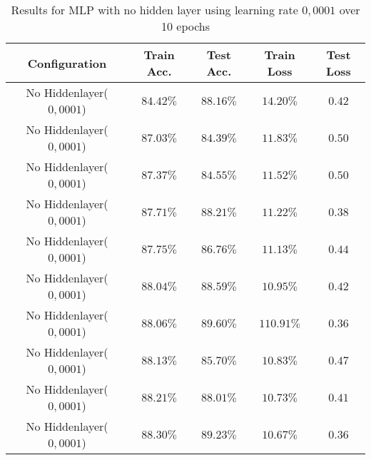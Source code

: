 \documentclass[a4paper]{article}
\begin{document}
\begin{table}[h!]
\centering
\begin{tabular}{|c|c|c|c|c|}
\hline
\textbf{Configuration} & \textbf{Train Acc.} & \textbf{Test Acc.} & \textbf{Train Loss} & \textbf{Test Loss} \\
\hline
No Hiddenlayer($0,0001$) & $84.42\%$ & $88.16\%$ & $14.20\%$ &  $0.42$\\
No Hiddenlayer($0,0001$) & $87.03\%$ & $84.39\%$ & $11.83\%$ &  $0.50$\\
No Hiddenlayer($0,0001$) & $87.37\%$ & $84.55\%$ & $11.52\%$ &  $0.50$\\
No Hiddenlayer($0,0001$) & $87.71\%$ & $88.21\%$ & $11.22\%$ &  $0.38$\\
No Hiddenlayer($0,0001$) & $87.75\%$ & $86.76\%$ & $11.13\%$ &  $0.44$\\
No Hiddenlayer($0,0001$) & $88.04\%$ & $88.59\%$ & $10.95\%$ &  $0.42$\\
No Hiddenlayer($0,0001$) & $88.06\%$ & $89.60\%$ & $110.91\%$ &  $0.36$\\
No Hiddenlayer($0,0001$) & $88.13\%$ & $85.70\%$ & $10.83\%$ &  $0.47$\\ 
No Hiddenlayer($0,0001$) & $88.21\%$ & $88.01\%$ & $10.73\%$ &  $0.41$\\
No Hiddenlayer($0,0001$) & $88.30\%$ & $89.23\%$ & $10.67\%$ &  $0.36$\\

\hline
\end{tabular}
\caption{Results for MLP with no hidden layer using learning rate $0{,}0001$ over 10 epochs}
\label{tab:example_table}
\end{table}
\end{document}
